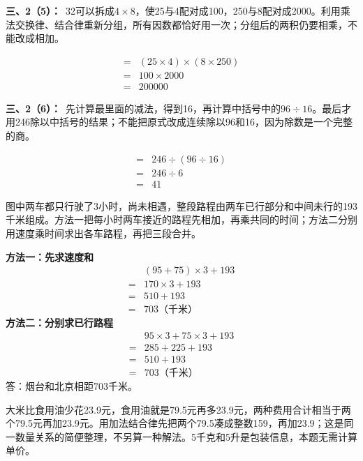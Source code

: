 \documentclass[multi=snippet,border=0pt]{standalone}
\newenvironment{snippet}[3]{\begin{minipage}{#1bp}\color{answerred}\fontsize{#2}{#3}\selectfont\raggedright}{\end{minipage}}
\begin{document}
\begin{snippet}{505}{11.5}{14}\textbf{三、2（5）：}\ 32可以拆成\(4\times8\)，使25与4配对成100，250与8配对成2000。利用乘法交换律、结合律重新分组，所有因数都恰好用一次；分组后的两积仍要相乘，不能改成相加。\end{snippet}
\begin{snippet}{141.4}{10.5}{12.8}\[\begin{aligned}={}&(25\times4)\times(8\times250)\\={}&100\times2000\\={}&200000\end{aligned}\]\end{snippet}
\begin{snippet}{505}{11.5}{14}\textbf{三、2（6）：}\ 先计算最里面的减法，得到16，再计算中括号中的\(96\div16\)。最后才用246除以中括号的结果；不能把原式改成连续除以96和16，因为除数是一个完整的商。\end{snippet}
\begin{snippet}{216.067}{10.5}{12.8}\[\begin{aligned}={}&246\div(96\div16)\\={}&246\div6\\={}&41\end{aligned}\]\end{snippet}
\begin{snippet}{505}{11.5}{14}图中两车都只行驶了3小时，尚未相遇，整段路程由两车已行部分和中间未行的193千米组成。方法一把每小时两车接近的路程先相加，再乘共同的时间；方法二分别用速度乘时间求出各车路程，再把三段合并。\par \textbf{方法一：先求速度和}\[\begin{aligned}&(95+75)\times3+193\\={}&170\times3+193\\={}&510+193\\={}&703\text{（千米）}\end{aligned}\]\textbf{方法二：分别求已行路程}\[\begin{aligned}&95\times3+75\times3+193\\={}&285+225+193\\={}&510+193\\={}&703\text{（千米）}\end{aligned}\]答：烟台和北京相距703千米。\end{snippet}
\begin{snippet}{505}{11.5}{14}大米比食用油少花23.9元，食用油就是79.5元再多23.9元，两种费用合计相当于两个79.5元再加23.9元。用加法结合律先把两个79.5凑成整数159，再加23.9；这是同一数量关系的简便整理，不另算一种解法。5千克和5升是包装信息，本题无需计算单价。\end{snippet}
\end{document}
